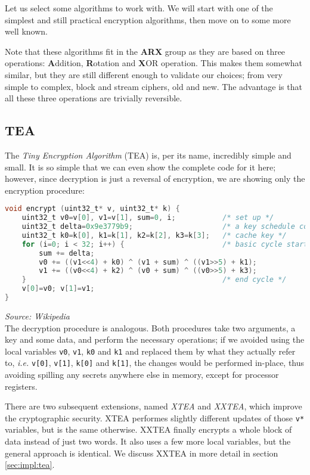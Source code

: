 \documentclass[a4paper,10pt,openright]{memoir}
\newcommand{\ie}{\emph{i.e.}\xspace}
\newcommand{\term}[1]{\textit{#1}}
\newcommand{\code}[1]{\texttt{#1}}
\begin{document}
Let us select some algorithms to work with. We will start with one of 
the simplest and still practical encryption algorithms, then move on to 
some more well known.

Note that these algorithms fit in the \textbf{ARX} group as they are 
based on three operations: \textbf{A}ddition, \textbf{R}otation and 
\textbf{X}OR operation. This makes them somewhat similar, but they are 
still different enough to validate our choices; from very simple to 
complex, block and stream ciphers, old and new. The advantage is that 
all these three operations are trivially reversible.

\subsection{TEA}

The \term{Tiny Encryption Algorithm} (TEA)\cite{tea95} is, per its 
name, incredibly simple and small. It is so simple that we can even 
show the complete code for it here; however, since decryption is just a 
reversal of encryption, we are showing only the encryption procedure:

\begin{lstlisting}[language=C]
void encrypt (uint32_t* v, uint32_t* k) {
    uint32_t v0=v[0], v1=v[1], sum=0, i;           /* set up */
    uint32_t delta=0x9e3779b9;                     /* a key schedule constant */
    uint32_t k0=k[0], k1=k[1], k2=k[2], k3=k[3];   /* cache key */
    for (i=0; i < 32; i++) {                       /* basic cycle start */
        sum += delta;
        v0 += ((v1<<4) + k0) ^ (v1 + sum) ^ ((v1>>5) + k1);
        v1 += ((v0<<4) + k2) ^ (v0 + sum) ^ ((v0>>5) + k3);
    }                                              /* end cycle */
    v[0]=v0; v[1]=v1;
}
\end{lstlisting}
\textit{\footnotesize Source: Wikipedia}\\

The decryption procedure is analogous. Both procedures take two 
arguments, a key and some data, and perform the necessary operations; 
if we avoided using the local variables \code{v0}, \code{v1}, \code{k0} 
and \code{k1} and replaced them by what they actually refer to, \ie 
\code{v[0]}, \code{v[1]}, \code{k[0]} and \code{k[1]}, the changes 
would be performed in-place, thus avoiding spilling any secrets 
anywhere else in memory, except for processor registers.

There are two subsequent extensions, named \term{XTEA} and 
\term{XXTEA}, which improve the cryptographic security. XTEA performes 
slightly different updates of those \code{v*} variables, but is the 
same otherwise. XXTEA finally encrypts a whole block of data instead of 
just two words. It also uses a few more local variables, but the 
general approach is identical. We discuss XXTEA in more detail in 
section \ref{sec:impl:tea}.
\end{document}
